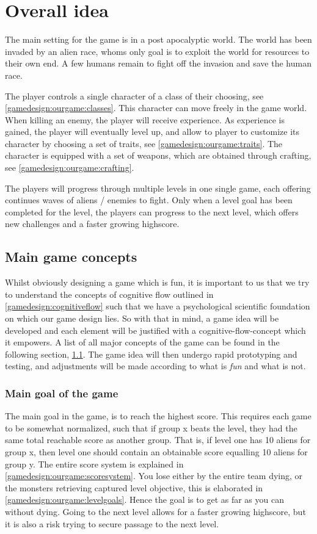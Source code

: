\section{Overall idea}
The main setting for the game is in a post apocalyptic world.
The world has been invaded by an alien race, whoms only goal is to exploit the world for resources to their own end. 
A few humans remain to fight off the invasion and save the human race. 

The player controls a single character of a class of their choosing, see \ref{gamedesign:ourgame:classes}. 
This character can move freely in the game world.
When killing an enemy, the player will receive experience.
As experience is gained, the player will eventually level up, and allow to player to customize its character by choosing a set of traits, see \ref{gamedesign:ourgame:traits}.
The character is equipped with a set of weapons, which are obtained through crafting, see \ref{gamedesign:ourgame:crafting}.

The players will progress through multiple levels in one single game, each offering continues waves of aliens / enemies to fight. Only when a level goal has been completed for the level, the players can progress to the next level, which offers new challenges and a faster growing highscore. 

\subsection{Main game concepts}\label{gamedesign:maingameconcepts}
Whilst obviously designing a game which is fun, it is important to us that we try to understand the concepts of cognitive flow outlined in \ref{gamedesign:cognitiveflow} such that we have a psychological scientific foundation on which our game design lies. 
So with that in mind, a game idea will be developed and each element will be justified with a cognitive-flow-concept which it empowers. A list of all major concepts of the game can be found in the following section, \ref{gamedesign:maingameconcepts}. 
The game idea will then undergo rapid prototyping and testing, and adjustments will be made according to what is \emph{fun} and what is not.  


\subsubsection{Main goal of the game}
The main goal in the game, is to reach the highest score. This requires each game to be somewhat normalized, such that if group x beats the level, they had the same total reachable score as another group. That is, if level one has 10 aliens for group x, then level one should contain an obtainable score equalling 10 aliens for group y. The entire score system is explained in \ref{gamedesign:ourgame:scoresystem}. You lose either by the entire team dying, or the monsters retrieving captured level objective, this is elaborated in \ref{gamedesign:ourgame:levelgoals}. Hence the goal is to get as far as you can without dying. Going to the next level allows for a faster growing highscore, but it is also a risk trying to secure passage to the next level.


